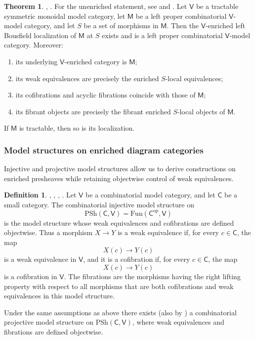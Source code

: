 \documentclass{amsart}
\newcommand{\cat}[1]{\mathsf{#1}}
\newcommand{\Fun}{\mathrm{Fun}}
\newcommand{\psh}{\mathrm{PSh}}
\renewcommand{\op}{\mathrm{op}}
\theoremstyle{definition}
\newtheorem{theorem}[equation]{Theorem}
\newtheorem{definition}[equation]{Definition}
\numberwithin{equation}{subsection}
\numberwithin{subsubsection}{subsection}
\begin{document}
\begin{theorem}\label{thm:enriched.left.bousfield.localization.concrete}
  \textnormal{\cite[Theorem~4.46 and Proposition~4.47]{Bar10}},
  \textnormal{\cite[Proposition~2.3.10]{GP26}}.
  For the unenriched statement, see
  \cite[Theorem~4.7]{Bar10} and \cite[Theorem~4.1.1]{Hir03}.
  Let \(\cat{V}\) be a tractable symmetric monoidal model category, let
  \(\cat{M}\) be a left proper combinatorial \(\cat{V}\)-model category, and
  let \(S\) be a set of morphisms in \(\cat{M}\). Then the
  \(\cat{V}\)-enriched left Bousfield localization of \(\cat{M}\) at \(S\)
  exists and is a left proper combinatorial \(\cat{V}\)-model category.
  Moreover:
  \begin{enumerate}
    \item its underlying \(\cat{V}\)-enriched category is \(\cat{M}\);
    \item its weak equivalences are precisely the enriched \(S\)-local
      equivalences;
    \item its cofibrations and acyclic fibrations coincide with those of
      \(\cat{M}\);
    \item its fibrant objects are precisely the fibrant enriched \(S\)-local
      objects of \(\cat{M}\).
  \end{enumerate}
  If \(\cat{M}\) is tractable, then so is its localization.
\end{theorem}

\subsubsection{Model structures on enriched diagram categories}
Injective and projective model structures allow us to derive constructions on
enriched presheaves while retaining objectwise control of weak equivalences.

\begin{definition}\label{def:injective.model.structure}
  \textnormal{\cite[Theorem~2.3]{Jar87}},
  \textnormal{\cite[Section~2]{DHI04}},
  \textnormal{\cite[Theorem~2.30]{Bar10}},
  \textnormal{\cite[Proposition A.2.8.2]{Lur17b}}.
  Let \(\cat{V}\) be a combinatorial model category, and let
  \(\cat{C}\) be a small category. The combinatorial injective model structure
  on
  \[
    \psh(\cat{C},\cat{V})
    =
    \Fun(\cat{C}^{\op},\cat{V})
  \]
  is the model structure whose weak equivalences and cofibrations are defined
  objectwise. Thus a morphism \(X\to Y\) is a weak equivalence if, for every
  \(c\in\cat{C}\), the map
  \[
    X(c)\to Y(c)
  \]
  is a weak equivalence in \(\cat{V}\), and it is a cofibration if, for every
  \(c\in\cat{C}\), the map
  \[
    X(c)\to Y(c)
  \]
  is a cofibration in \(\cat{V}\). The fibrations are the morphisms having the
  right lifting property with respect to all morphisms that are both
  cofibrations and weak equivalences in this model structure.

  Under the same assumptions as above there exists (also by
  \cite[Proposition~A.2.8.2]{Lur17b}) a combinatorial projective
  model structure on \(\psh(\cat{C}, \cat{V})\), where weak equivalences and
  fibrations are defined objectwise.
\end{definition}
\end{document}
